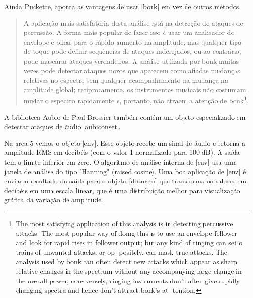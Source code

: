 \documentclass[draft]{ppgmus}
\begin{document}
Ainda Puckette, aponta as vantagens de usar [bonk\texttildelow]
em vez de outros métodos.

\begin{quote}
A aplicação mais satisfatória desta análise está na
detecção de ataques de percussão. A forma mais popular
de fazer isso é usar um analisador de envelope e olhar
para o rápido aumento na amplitude, mas qualquer tipo de
toque pode definir sequências de ataques indesejados, ou ao contrário, 
pode mascarar ataques verdadeiros. A análise utilizada por
bonk muitas vezes pode detectar ataques novos que aparecem como
afiadas mudanças relativas no espectro sem qualquer
acompanhamento na mudança na amplitude global; reciprocamente, 
os instrumentos musicais não costumam mudar o espectro rapidamente
e, portanto, não atraem a atenção de bonk\footnote
{The most satisfying application of this analysis is in
detecting percussive attacks. The most popular way
of doing this is to use an envelope follower and look
for rapid rises in follower output; but any kind of
ringing can set o trains of unwanted attacks, or op-
positely, can mask true attacks. The analysis used by
bonk can often detect new attacks which appear as
sharp relative changes in the spectrum without any
accompanying large change in the overall power; con-
versely, ringing instruments don't often give rapidly
changing spectra and hence don't attract bonk's at-
tention.}. \cite{bonk}
\end{quote}

A biblioteca Aubio de Paul Brossier também contém um objeto
especializado em detectar ataques de áudio [aubioonset\texttildelow].



Na área 5 vemos o objeto [env\texttildelow]. Esse objeto recebe um sinal de áudio
e retorna a amplitude RMS em decibéis (com o valor 1 normalizado para 100 dB).
A saída tem o limite inferior em zero. O algoritmo de análise interna de [env\texttildelow]
usa uma janela de análise do tipo "Hanning" (raised cosine). Uma boa aplicação de 
[env\texttildelow] é enviar o resultado da saída para o objeto [dbtorms] que transforma
os valores em decibéis em uma escala linear, que é uma distribuição melhor para visualização
gráfica da variação de amplitude.
\end{document}
